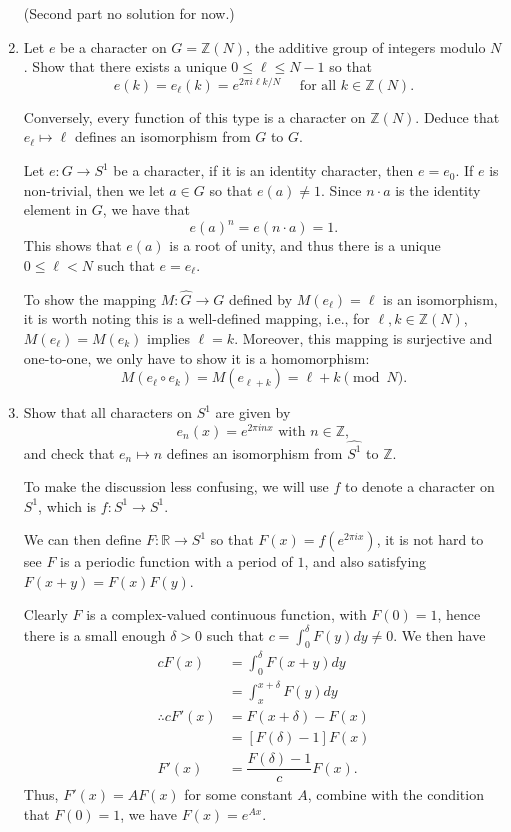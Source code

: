 \documentclass{article}
\begin{document}
\begin{enumerate}
\begin{solution}
        (Second part no solution for now.)
    \end{solution}

    \item Let $e$ be a character on $G=\mathbb Z(N)$, the additive group of integers modulo $N$. Show that there exists a unique
    $0\leq \ell\leq N-1$ so that 
    $$e(k) = e_\ell(k) = e^{2\pi i\ell k/N}\quad\text{ for all } k\in\mathbb Z(N).$$

    Conversely, every function of this type is a character on $\mathbb Z(N)$. Deduce that $e_\ell\mapsto \ell$ defines an
    isomorphism from $G$ to $G$.

    \begin{solution}
        Let $e: G\to S^1$ be a character, if it is an identity character, then $e=e_0$.
        If $e$ is non-trivial, then we let $a\in G$ so that $e(a)\neq 1$.
        Since $n\cdot a$ is the identity element in $G$, we have that 
        $$e(a)^n = e(n\cdot a) = 1.$$
        This shows that $e(a)$ is a root of unity, and thus there is a unique $0\leq \ell< N$ such that $e=e_\ell$.

        To show the mapping $M: \hat G \to G$ defined by $M(e_\ell) = \ell$ is an isomorphism, it is worth noting this is a
        well-defined mapping, i.e., for $\ell, k\in \mathbb Z(N)$, $M(e_\ell)=M(e_k)$ implies $\ell=k$.
        Moreover, this mapping is surjective and one-to-one, we only have to show it is a homomorphism:
        $$M(e_\ell \circ e_k) = M(e_{\ell+k}) = \ell+k\pmod N.$$
    \end{solution}

    \item Show that all characters on $S^1$ are given by 
    $$e_n(x) = e^{2\pi inx}\text{ with }n\in \mathbb Z,$$
    and check that $e_n\mapsto n$ defines an isomorphism from $\widehat{S^1}$ to $\mathbb Z$. 

    \begin{solution}
        To make the discussion less confusing, we will use $f$ to denote a character on $S^1$, which is $f: S^1\to S^1$.

        We can then define $F: \mathbb R\to S^1$ so that $F(x) = f(e^{2\pi ix})$, it is not hard to see $F$ is a periodic function
        with a period of $1$, and also satisfying $F(x+y) = F(x)F(y)$.

        Clearly $F$ is a complex-valued continuous function, with $F(0)=1$, hence there is a small enough $\delta>0$ such that
        $c=\int_0^\delta F(y)dy\neq 0$. We then have
        \begin{align*}
            cF(x) &= \int_0^\delta F(x+y)dy\\
            &= \int_x^{x+\delta} F(y)dy\\
            \therefore cF'(x) &= F(x+\delta) - F(x)\\
            &= [F(\delta)-1]F(x)\\
            F'(x) &= \dfrac{F(\delta)-1}{c}F(x).
        \end{align*} 
        Thus, $F'(x) = AF(x)$ for some constant $A$, combine with the condition that $F(0)=1$, we have $F(x) = e^{Ax}$.


\end{solution}
\end{enumerate}
\end{document}
